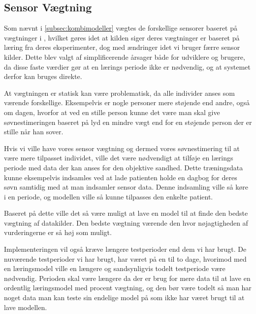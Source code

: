 \subsection{Sensor Vægtning}
Som nævnt i \cref{subsec:kombimodeller} vægtes de forskellige sensorer baseret på vægtninger i \citet{6563918}, hvilket gøres idet at kilden siger deres vægtninger er baseret på læring fra deres eksperimenter, dog med ændringer idet vi bruger færre sensor kilder.
Dette blev valgt af simplificerende årsager både for udviklere og brugere, da disse faste værdier gør at en lærings periode ikke er nødvendig, og at systemet derfor kan bruges direkte.

At vægtningen er statisk kan være problematisk, da alle individer anses som værende forskellige. 
Eksempelvis er nogle personer mere støjende end andre, også om dagen, hvorfor at ved en stille person kunne det være man skal give søvnestimeringen baseret på lyd en mindre vægt end for en støjende person der er stille når han sover.

Hvis vi ville have vores sensor vægtning og dermed vores søvnestimering til at være mere tilpasset individet, ville det være nødvendigt at tilføje en lærings periode med data der kan anses for den objektive sandhed.
Dette træningsdata kunne eksempelvis indsamles ved at lade patienten holde en dagbog for deres søvn samtidig med at man indsamler sensor data.
Denne indsamling ville så køre i en periode, og modellen ville så kunne tilpasses den enkelte patient.

Baseret på dette ville det så være muligt at lave en model til at finde den bedste vægtning af datakilder.
Den bedste vægtning værende den hvor nøjagtigheden af vurderingerne er så høj som muligt.

Implementeringen vil også kræve længere testperioder end dem vi har brugt.
De nuværende testperioder vi har brugt, har været på en til to dage, hvorimod med en læringsmodel ville en længere og sandsynligvis todelt testperiode være nødvendig.
Perioden skal være længere da der er brug for mere data til at lave en ordentlig læringsmodel med procent vægtning, og den bør være todelt så man har noget data man kan teste sin endelige model på som ikke har været brugt til at lave modellen.
